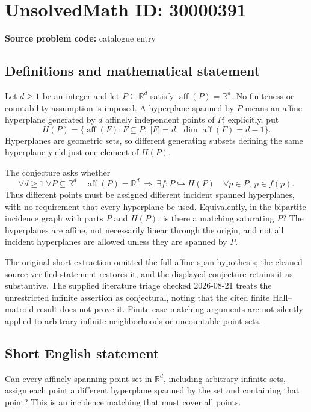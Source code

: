\documentclass[11pt]{article}
\newcommand{\R}{\mathbb{R}}
\begin{document}
\section*{UnsolvedMath ID: 30000391}
\textbf{Source problem code:} catalogue entry
\subsection{Definitions and mathematical statement}
Let \(d\geq1\) be an integer and let \(P\subseteq\R^d\) satisfy \(\operatorname{aff}(P)=\R^d\). No finiteness or countability assumption is imposed. A hyperplane spanned by \(P\) means an affine hyperplane generated by \(d\) affinely independent points of \(P\); explicitly, put
\[
H(P)=\{\operatorname{aff}(F):F\subseteq P,\ |F|=d,\ \dim\operatorname{aff}(F)=d-1\}.
\]
Hyperplanes are geometric sets, so different generating subsets defining the same hyperplane yield just one element of \(H(P)\).

The conjecture asks whether
\[
\forall d\geq1\ \forall P\subseteq\R^d\quad
\operatorname{aff}(P)=\R^d
\ \Longrightarrow\ 
\exists f:P\hookrightarrow H(P)\quad\forall p\in P,\ p\in f(p).
\]
Thus different points must be assigned different incident spanned hyperplanes, with no requirement that every hyperplane be used. Equivalently, in the bipartite incidence graph with parts \(P\) and \(H(P)\), is there a matching saturating \(P\)? The hyperplanes are affine, not necessarily linear through the origin, and not all incident hyperplanes are allowed unless they are spanned by \(P\).

The original short extraction omitted the full-affine-span hypothesis; the cleaned source-verified statement restores it, and the displayed conjecture retains it as substantive. The supplied literature triage checked 2026-08-21 treats the unrestricted infinite assertion as conjectural, noting that the cited finite Hall--matroid result does not prove it. Finite-case matching arguments are not silently applied to arbitrary infinite neighborhoods or uncountable point sets.
\subsection{Short English statement}
Can every affinely spanning point set in \(\R^d\), including arbitrary infinite sets, assign each point a different hyperplane spanned by the set and containing that point? This is an incidence matching that must cover all points.
\end{document}

